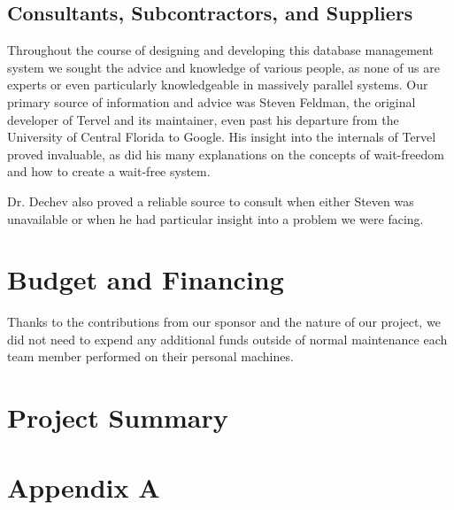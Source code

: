 \documentclass[letterpaper]{article}
\begin{document}
\newpage

\subsection{Consultants, Subcontractors, and Suppliers}
Throughout the course of designing and developing this database management system we sought the advice
and knowledge of various people, as none of us are experts or even particularly knowledgeable in 
massively parallel systems. Our primary source of information and advice was Steven Feldman, the 
original developer of Tervel and its maintainer, even past his departure from the University of Central
Florida to Google. His insight into the internals of Tervel proved invaluable, as did his many 
explanations on the concepts of wait-freedom and how to create a wait-free system.
\par\vspace{\baselineskip}
Dr. Dechev also proved a reliable source to consult when either Steven was unavailable or when he
had particular insight into a problem we were facing. 
\newpage

\section{Budget and Financing}
Thanks to the contributions from our sponsor and the nature of our project, we did not need to expend
any additional funds outside of normal maintenance each team member performed on their personal
machines.
\newpage

\section{Project Summary}
\newpage



\newpage

\appendix
\section{Appendix A}
\end{document}
